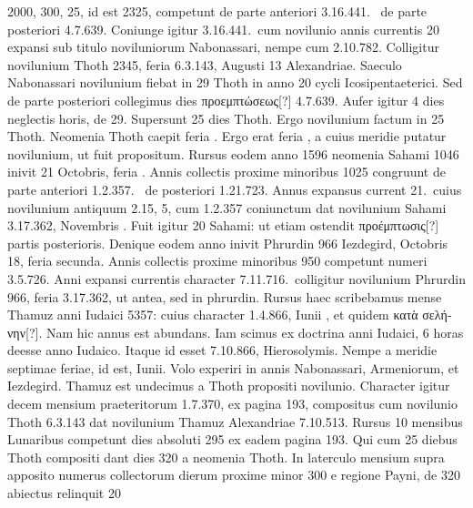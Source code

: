 2000, 300, 25, id est 2325,
competunt de parte anteriori 3.16.441.\ %
de parte posteriori 4.7.639. %
Coniunge igitur 3.16.441.\ cum novilunio
annis currentis 20 expansi sub
titulo noviluniorum Nabonassari, nempe cum 2.10.782.
Colligitur
novilunium Thoth 2345, feria 6.3.143, Augusti 13 Alexandriae.
Saeculo Nabonassari novilunium fiebat in 29 Thoth in anno 20
cycli Icosipentaeterici.
Sed de parte posteriori collegimus dies \textgreek{προεμπτώσεως}[?]
4.7.639.
Aufer igitur 4 dies neglectis horis, de 29.
Supersunt 25 dies Thoth.
Ergo novilunium factum in 25 Thoth.
Neomenia Thoth caepit feria .
Ergo  erat feria , a cuius
meridie putatur novilunium, ut fuit propositum.
Rursus eodem anno
1596 neomenia Sahami 1046 inivit 21 Octobris, feria .
Annis
collectis proxime minoribus 1025 congruunt de parte anteriori 1.2.357.\ %
de posteriori 1.21.723.
Annus expansus current 21.\ cuius novilunium
antiquum 2.15, 5, cum 1.2.357 coniunctum dat novilunium
Sahami 3.17.362, Novembris .
Fuit igitur 20 Sahami: ut
etiam ostendit \textgreek{προέμπτωσις}[?] partis posterioris.
Denique eodem anno
inivit Phrurdin 966 Iezdegird, Octobris 18, feria secunda.
Annis
collectis proxime minoribus 950 competunt numeri 3.5.726.
Anni
expansi currentis character 7.11.716.\ colligitur novilunium Phrurdin
966, feria 3.17.362, ut antea, sed in  phrurdin.
Rursus
haec scribebamus mense Thamuz anni Iudaici 5357: cuius character
1.4.866, Iunii , et quidem \textgreek{κατὰ σελήνην}[?].
Nam hic annus
est abundans.
Iam scimus ex doctrina anni Iudaici, 6 horas deesse
anno Iudaico.
Itaque id esset 7.10.866, Hierosolymis.
Nempe a
meridie septimae feriae, id est,  Iunii.
Volo experiri in annis Nabonassari,
Armeniorum, et Iezdegird.
%
Thamuz est undecimus a Thoth
propositi novilunio.
Character igitur decem mensium praeteritorum
1.7.370, ex pagina 193, compositus cum novilunio Thoth 6.3.143
dat novilunium Thamuz Alexandriae 7.10.513.
Rursus 10 mensibus
Lunaribus competunt dies absoluti 295 ex eadem pagina 193.
Qui
cum 25 diebus Thoth compositi dant dies 320 a neomenia Thoth.
%
In laterculo mensium supra apposito numerus collectorum dierum
proxime minor 300 e regione Payni, de 320 abiectus relinquit 20
